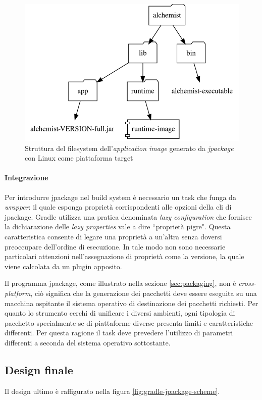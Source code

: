 \begin{figure}
	\centering
	\includegraphics[width=.7\linewidth]{figures/application-image-folder-structure.pdf}
	\caption{Struttura del filesystem dell'\textit{application image} generato da \textit{jpackage} con Linux come piattaforma target}
	\label{fig:application-image-folder-structure}
\end{figure}

\paragraph{Integrazione} Per introdurre jpackage nel build system è necessario un task che funga da \textit{wrapper}: il quale esponga proprietà corrispondenti alle opzioni della \ac{cli} di jpackage. Gradle utilizza una pratica denominata \textit{lazy configuration} che fornisce la dichiarazione delle \textit{lazy properties} vale a dire ``proprietà pigre". Questa caratteristica consente di legare una proprietà a un'altra senza doversi preoccupare dell'ordine di esecuzione. In tale modo non sono necessarie particolari attenzioni nell'assegnazione di proprietà come la versione, la quale viene calcolata da un plugin apposito. 

Il programma jpackage, come illustrato nella sezione \ref{sec:packaging}, non è \textit{cross-platform}, ciò significa che la generazione dei pacchetti deve essere eseguita su una macchina ospitante il sistema operativo di destinazione dei pacchetti richiesti. Per quanto lo strumento cerchi di unificare i diversi ambienti, ogni tipologia di pacchetto specialmente se di piattaforme diverse presenta limiti e caratteristiche differenti. Per questa ragione il task deve prevedere l'utilizzo di parametri differenti a seconda del sistema operativo sottostante.

\subsection{Design finale} Il design ultimo è raffigurato nella figura \ref{fig:gradle-jpackage-scheme}. 


